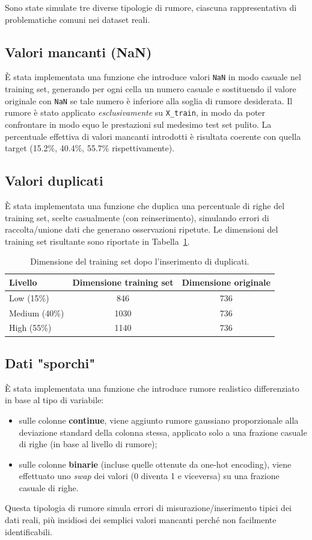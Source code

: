 \documentclass[12pt]{article}
\begin{document}
Sono state simulate tre diverse tipologie di rumore, ciascuna rappresentativa di problematiche comuni nei dataset reali.

\subsection{Valori mancanti (NaN)}
È stata implementata una funzione che introduce valori \texttt{NaN} in modo casuale nel training set, generando per ogni cella un numero casuale e sostituendo il valore originale con \texttt{NaN} se tale numero è inferiore alla soglia di rumore desiderata. Il rumore è stato applicato \emph{esclusivamente} su \texttt{X\_train}, in modo da poter confrontare in modo equo le prestazioni sul medesimo test set pulito. La percentuale effettiva di valori mancanti introdotti è risultata coerente con quella target (15.2\%, 40.4\%, 55.7\% rispettivamente).

\subsection{Valori duplicati}
È stata implementata una funzione che duplica una percentuale di righe del training set, scelte casualmente (con reinserimento), simulando errori di raccolta/unione dati che generano osservazioni ripetute. Le dimensioni del training set risultante sono riportate in Tabella~\ref{tab:dupes_size}.

\begin{table}[H]
\centering
\begin{tabular}{lcc}
\toprule
\textbf{Livello} & \textbf{Dimensione training set} & \textbf{Dimensione originale} \\
\midrule
Low (15\%) & 846 & 736 \\
Medium (40\%) & 1030 & 736 \\
High (55\%) & 1140 & 736 \\
\bottomrule
\end{tabular}
\caption{Dimensione del training set dopo l'inserimento di duplicati.}
\label{tab:dupes_size}
\end{table}

\subsection{Dati "sporchi"}
È stata implementata una funzione che introduce rumore realistico differenziato in base al tipo di variabile:
\begin{itemize}
    \item sulle colonne \textbf{continue}, viene aggiunto rumore gaussiano proporzionale alla deviazione standard della colonna stessa, applicato solo a una frazione casuale di righe (in base al livello di rumore);
    \item sulle colonne \textbf{binarie} (incluse quelle ottenute da one-hot encoding), viene effettuato uno \emph{swap} dei valori (0 diventa 1 e viceversa) su una frazione casuale di righe.
\end{itemize}
Questa tipologia di rumore simula errori di misurazione/inserimento tipici dei dati reali, più insidiosi dei semplici valori mancanti perché non facilmente identificabili.
\end{document}
